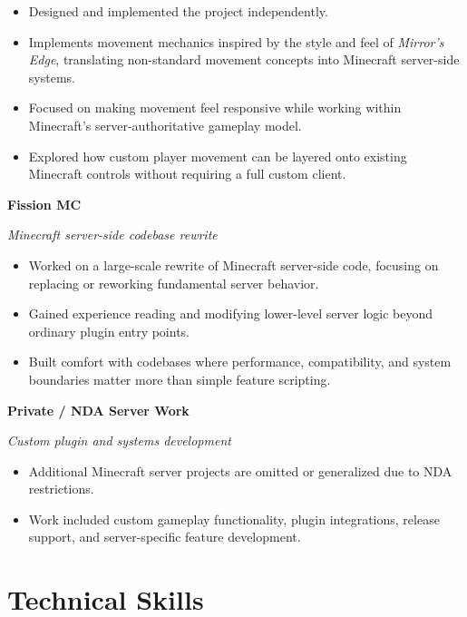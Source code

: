 \documentclass[10pt,letterpaper]{article}
\begin{document}
\begin{itemize}
  \item Designed and implemented the project independently.
  \item Implements movement mechanics inspired by the style and feel of
        \textit{Mirror's Edge}, translating non-standard movement concepts into
        Minecraft server-side systems.
  \item Focused on making movement feel responsive while working within
        Minecraft's server-authoritative gameplay model.
  \item Explored how custom player movement can be layered onto existing
        Minecraft controls without requiring a full custom client.
\end{itemize}

\textbf{Fission MC}

\textit{Minecraft server-side codebase rewrite}

\begin{itemize}
  \item Worked on a large-scale rewrite of Minecraft server-side code,
        focusing on replacing or reworking fundamental server behavior.
  \item Gained experience reading and modifying lower-level server logic beyond
        ordinary plugin entry points.
  \item Built comfort with codebases where performance, compatibility, and
        system boundaries matter more than simple feature scripting.
\end{itemize}

\textbf{Private / NDA Server Work}

\textit{Custom plugin and systems development}

\begin{itemize}
  \item Additional Minecraft server projects are omitted or generalized due to
        NDA restrictions.
  \item Work included custom gameplay functionality, plugin integrations,
        release support, and server-specific feature development.
\end{itemize}

\section{Technical Skills}
\end{document}
